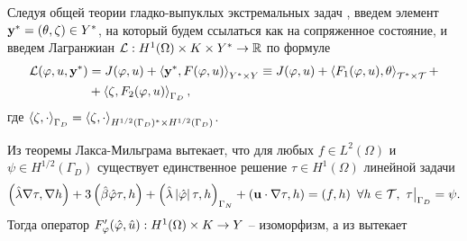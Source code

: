 Следуя общей теории гладко-выпуклых экстремальных задач \cite{lit21}, введем элемент $\mathbf{y}^{*} = \left( \theta, \zeta \right) \in Y^{*}$, на который будем ссылаться как на сопряженное состояние, и введем Лагранжиан $\mathcal{L}: H^1 (\Omega) \times K \times Y^{*} \to \mathbb{R}$ по формуле
\begin{equation}
	\label{Lagran}
	\begin{split}
		\mathcal{L}(\varphi, u, \mathbf{y}^{*}) &= J(\varphi, u) 
		+ \left\langle \mathbf{y}^{*}, F(\varphi, u) \right\rangle_{Y^{*} \times Y} 
		\equiv J(\varphi, u) 
		+ \left\langle F_1(\varphi, u), \theta \right\rangle_{\mathcal{T}^{*} \times \mathcal{T}} + \\
		&+ \left\langle \zeta, F_2(\varphi, u) \right\rangle_{\Gamma_D},
	\end{split}
\end{equation}
где 
$\left\langle \zeta, \cdot \right\rangle_{\Gamma_D} = \left\langle \zeta, \cdot \right\rangle_{H^{1/2}(\Gamma_D)^{*} \times H^{1/2}(\Gamma_D)}$.

Из теоремы Лакса-Мильграма вытекает, что для любых $f \in L^2 (\Omega)$ и $\psi \in H^{1/2} (\Gamma_D)$ существует единственное решение $\tau \in H^1 (\Omega)$ линейной задачи 
\begin{equation}
	\label{LinPr}
	\left( \hat \lambda \nabla \tau, \nabla h \right) 
	+ 3 \left( \hat \beta \hat {\varphi} \tau, h \right) 
	+ \left( \hat \lambda \left\vert \hat {\varphi} \right\vert \tau, h \right)_{\Gamma_N} 
	+ \left( \mathbf{u} \cdot \nabla \tau, h \right) = \left( f, h \right) ~ \forall h \in \mathcal{T}, ~
	\tau\bigl. \bigr\vert_{\Gamma_D} = \psi.
\end{equation}
Тогда оператор $F'_\varphi (\hat {\varphi}, \hat u) : H^1 (\Omega) \times K \to Y$ -- изоморфизм, а из \cite{lit21} вытекает

